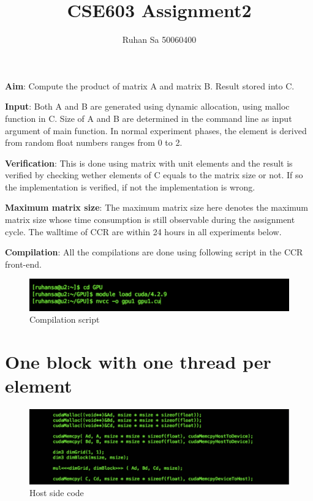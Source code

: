 \documentclass {article}
\begin{document}
\title{CSE603 Assignment2}
\author {Ruhan Sa 50060400}
\maketitle
\noindent \textbf{Aim}: Compute the product of matrix A and matrix B. Result stored into C.

\noindent \textbf{Input}: Both A and B are generated using dynamic allocation, using malloc function in C. Size of A and B are determined in the command line as input argument of main function. In normal experiment phases, the element is derived from random float numbers ranges from 0 to 2.

\noindent \textbf{Verification}:  This is done using matrix with unit elements and the result is verified by checking wether elements of C equals to the matrix size or not. If so the implementation is verified, if not the implementation is wrong.

\noindent \textbf{Maximum matrix size}: The maximum matrix size here denotes the maximum matrix size whose time consumption is still observable during the assignment cycle. The walltime of CCR are within 24 hours in all experiments below.

\noindent \textbf{Compilation}: All the compilations are done using following script  in the CCR front-end.
\begin{figure}[htp!]
\centering
\includegraphics[width = \linewidth]{nvcc.pdf}
\caption{Compilation script}
\label{fig:nvcc}
\end{figure}

\section{One block with one thread per element}

\begin{figure}[htp!]
\centering
\includegraphics[width = \linewidth]{gpu11.pdf}
\caption{Host side code}
\label{fig:one}
\end{figure}
\end{document}
